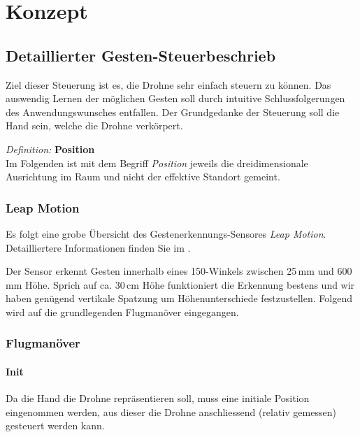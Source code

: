 \chapter{Konzept}

\section{Detaillierter Gesten-Steuerbeschrieb}
\label{sec:gestureControll}

Ziel dieser Steuerung ist es, die Drohne sehr einfach steuern zu können.
Das auswendig Lernen der möglichen Gesten soll durch intuitive Schlussfolgerungen des Anwendungswunsches entfallen.
Der Grundgedanke der Steuerung soll die Hand sein, welche die Drohne verkörpert.

\begin{framed}
\textit{Definition: }\textbf{Position}\\
Im Folgenden ist mit dem Begriff \textit{Position} jeweils die dreidimensionale Ausrichtung im Raum und nicht der effektive Standort gemeint.
\end{framed}

\subsection{Leap Motion}
Es folgt eine grobe Übersicht des Gestenerkennungs-Sensores \textit{Leap Motion}.
Detailliertere Informationen finden Sie im .

Der Sensor erkennt Gesten innerhalb eines 150\textdegree-Winkels zwischen 25\,mm und 600\,mm Höhe.
Sprich auf ca. 30\,cm Höhe funktioniert die Erkennung bestens und wir haben genügend vertikale Spatzung um Höhenunterschiede festzustellen.
Folgend wird auf die grundlegenden Flugmanöver eingegangen.


\subsection{Flugmanöver}

\subsubsection{Init}

Da die Hand die Drohne repräsentieren soll, muss eine initiale Position eingenommen werden, aus dieser die Drohne anschliessend (relativ gemessen) gesteuert werden kann.

